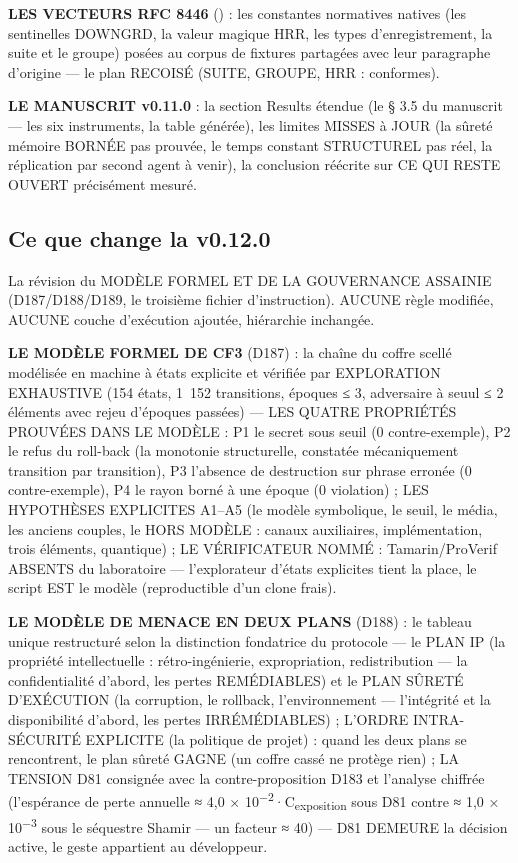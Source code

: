 \textbf{LES VECTEURS RFC 8446} () : les
constantes normatives natives (les sentinelles DOWNGRD, la valeur
magique HRR, les types d'enregistrement, la suite et le groupe) posées
au corpus de fixtures partagées avec leur paragraphe d'origine — le
plan RECOISÉ (SUITE, GROUPE, HRR : conformes).

\textbf{LE MANUSCRIT v0.11.0} : la section Results étendue (le § 3.5 du
manuscrit — les six instruments, la table générée), les limites MISSES à
JOUR (la sûreté mémoire BORNÉE pas prouvée, le temps constant
STRUCTUREL pas réel, la réplication par second agent à venir), la
conclusion réécrite sur CE QUI RESTE OUVERT précisément mesuré.

\subsection{Ce que change la v0.12.0}\label{sec:nouveautes120}

La révision du MODÈLE FORMEL ET DE LA GOUVERNANCE ASSAINIE (D187/D188/D189,
le troisième fichier d'instruction). AUCUNE règle modifiée, AUCUNE couche
d'exécution ajoutée, hiérarchie inchangée.

\textbf{LE MODÈLE FORMEL DE CF3} (D187) : la chaîne du coffre scellé
modélisée en machine à états explicite et vérifiée par EXPLORATION
EXHAUSTIVE (154 états, 1~152 transitions, époques ≤ 3, adversaire à seuul
≤ 2 éléments avec rejeu d'époques passées) — LES QUATRE PROPRIÉTÉS
PROUVÉES DANS LE MODÈLE : P1 le secret sous seuil (0 contre-exemple),
P2 le refus du roll-back (la monotonie structurelle, constatée
mécaniquement transition par transition), P3 l'absence de destruction sur
phrase erronée (0 contre-exemple), P4 le rayon borné à une époque (0
violation) ; LES HYPOTHÈSES EXPLICITES A1--A5 (le modèle symbolique, le
seuil, le média, les anciens couples, le HORS MODÈLE : canaux
auxiliaires, implémentation, trois éléments, quantique) ; LE
VÉRIFICATEUR NOMMÉ : Tamarin/ProVerif ABSENTS du laboratoire —
l'explorateur d'états explicites tient la place, le script EST le modèle
(reproductible d'un clone frais).

\textbf{LE MODÈLE DE MENACE EN DEUX PLANS} (D188) : le tableau unique
restructuré selon la distinction fondatrice du protocole — le PLAN IP
(la propriété intellectuelle : rétro-ingénierie, expropriation,
redistribution — la confidentialité d'abord, les pertes REMÉDIABLES) et
le PLAN SÛRETÉ D'EXÉCUTION (la corruption, le rollback, l'environnement
— l'intégrité et la disponibilité d'abord, les pertes IRRÉMÉDIABLES) ;
L'ORDRE INTRA-SÉCURITÉ EXPLICITE (la politique de projet) : quand les
deux plans se rencontrent, le plan sûreté GAGNE (un coffre cassé ne
protège rien) ; LA TENSION D81 consignée avec la contre-proposition D183
et l'analyse chiffrée (l'espérance de perte annuelle ≈ 4,0 ×
10\textsuperscript{−2}·C\textsubscript{exposition} sous D81 contre ≈ 1,0
× 10\textsuperscript{−3} sous le séquestre Shamir — un facteur ≈ 40) —
D81 DEMEURE la décision active, le geste appartient au développeur.

